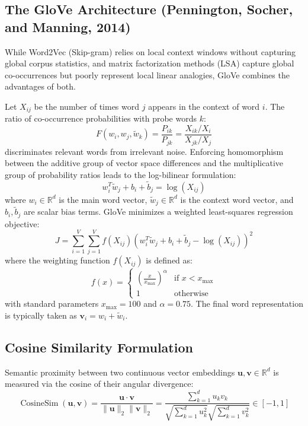 \subsection{The GloVe Architecture (Pennington, Socher, and Manning, 2014)}
While Word2Vec (Skip-gram) relies on local context windows without capturing global corpus statistics, and matrix factorization methods (LSA) capture global co-occurrences but poorly represent local linear analogies, GloVe combines the advantages of both.

Let $X_{ij}$ be the number of times word $j$ appears in the context of word $i$. The ratio of co-occurrence probabilities with probe words $k$:
\begin{equation}
    F(w_i, w_j, \tilde{w}_k) = \frac{P_{ik}}{P_{jk}} = \frac{X_{ik} / X_i}{X_{jk} / X_j}
\end{equation}
discriminates relevant words from irrelevant noise. Enforcing homomorphism between the additive group of vector space differences and the multiplicative group of probability ratios leads to the log-bilinear formulation:
\begin{equation}
    w_i^T \tilde{w}_j + b_i + \tilde{b}_j = \log(X_{ij})
\end{equation}
where $w_i \in \mathbb{R}^d$ is the main word vector, $\tilde{w}_j \in \mathbb{R}^d$ is the context word vector, and $b_i, \tilde{b}_j$ are scalar bias terms. GloVe minimizes a weighted least-squares regression objective:
\begin{equation}
    J = \sum_{i=1}^{V} \sum_{j=1}^{V} f(X_{ij}) \left( w_i^T \tilde{w}_j + b_i + \tilde{b}_j - \log(X_{ij}) \right)^2
\end{equation}
where the weighting function $f(X_{ij})$ is defined as:
\begin{equation}
    f(x) = \begin{cases} \left(\frac{x}{x_{\max}}\right)^\alpha & \text{if } x < x_{\max} \\ 1 & \text{otherwise} \end{cases}
\end{equation}
with standard parameters $x_{\max} = 100$ and $\alpha = 0.75$. The final word representation is typically taken as $\mathbf{v}_i = w_i + \tilde{w}_i$.

\subsection{Cosine Similarity Formulation}
Semantic proximity between two continuous vector embeddings $\mathbf{u}, \mathbf{v} \in \mathbb{R}^d$ is measured via the cosine of their angular divergence:
\begin{equation}
    \operatorname{CosineSim}(\mathbf{u}, \mathbf{v}) = \frac{\mathbf{u} \cdot \mathbf{v}}{\|\mathbf{u}\|_2 \|\mathbf{v}\|_2} = \frac{\sum_{k=1}^d u_k v_k}{\sqrt{\sum_{k=1}^d u_k^2} \sqrt{\sum_{k=1}^d v_k^2}} \in [-1, 1]
\end{equation}

